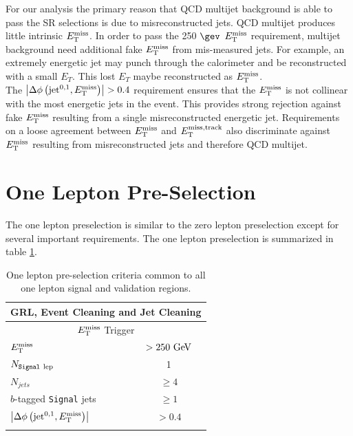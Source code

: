 \indent For our analysis the primary reason that QCD multijet background is able to pass the SR selections is due to misreconstructed jets.  QCD multijet produces little intrinsic $E_{\mathrm{T}}^{\mathrm{miss}}$.  In order to pass the 250 $\gev$ $E_{\mathrm{T}}^{\mathrm{miss}}$ requirement, multijet background need additional fake $E_{\mathrm{T}}^{\mathrm{miss}}$ from mis-measured jets.  For example, an extremely energetic jet may punch through the calorimeter and be reconstructed with a small $E_T$.  This lost $E_T$ maybe reconstructed as $E_{\mathrm{T}}^{\mathrm{miss}}$.  \\

\indent The $\left|\Delta\phi\left(\mathrm{jet}^{0,1},E_{\mathrm{T}}^{\mathrm{miss}}\right)\right| > 0.4$ requirement ensures that the $E_{\mathrm{T}}^{\mathrm{miss}}$ is not collinear with the most energetic jets in the event.  This provides strong rejection against fake $E_{\mathrm{T}}^{\mathrm{miss}}$ resulting from a single misreconstructed energetic jet.  Requirements on a loose agreement between $E_{\mathrm{T}}^{\mathrm{miss}}$ and $E_{\mathrm{T}}^{\mathrm{miss, track}}$ also discriminate against $E_{\mathrm{T}}^{\mathrm{miss}}$ resulting from misreconstructed jets and therefore QCD multijet. \\

\section{One Lepton Pre-Selection}

\indent The one lepton preselection is similar to the zero lepton preselection except for several important requirements.  The one lepton preselection is summarized in table \ref{tab:1Lcommon}. \\

\begin{table}[htbp]
  \begin{center}
    \begin{tabular}{l|c} \hline\hline
      \multicolumn{2}{c}{GRL, Event Cleaning and Jet Cleaning} \\ \hline
      \multicolumn{2}{c}{$E_{\mathrm{T}}^{\mathrm{miss}}$ Trigger} \\ \hline
      $E_{\mathrm{T}}^{\mathrm{miss}}$ & $> 250\GeV$ \\ \hline
      $N_{\rm{{\tt Signal}~lep}}$ & 1 \\ \hline
    $N_{jets}$ & $\ge 4$ \\ \hline
      $b$-tagged {\tt Signal} jets & $\ge1$ \\ \hline
      $\left|\Delta\phi\left(\mathrm{jet}^{0,1},E_{\mathrm{T}}^{\mathrm{miss}}\right)\right|$ & $> 0.4$ \\
              & \\ [-2.5ex] \hline
    \end{tabular}
  \caption{ One lepton pre-selection criteria common to all one lepton signal and validation regions.}
  \end{center}
  \label{tab:1Lcommon}
\end{table}

